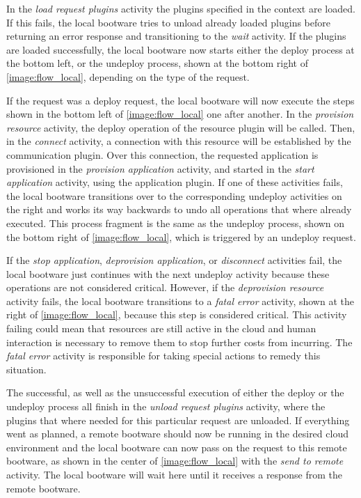 In the \textit{load request plugins} activity the plugins specified in the context are loaded.
If this fails, the local bootware tries to unload already loaded plugins before returning an error response and transitioning to the \textit{wait} activity.
If the plugins are loaded successfully, the local bootware now starts either the deploy process at the bottom left, or the undeploy process, shown at the bottom right of \autoref{image:flow_local}, depending on the type of the request.

If the request was a deploy request, the local bootware will now execute the steps shown in the bottom left of \autoref{image:flow_local} one after another.
In the \textit{provision resource} activity, the deploy operation of the resource plugin will be called.
Then, in the \textit{connect} activity, a connection with this resource will be established by the communication plugin.
Over this connection, the requested application is provisioned in the \textit{provision application} activity, and started in the \textit{start application} activity, using the application plugin.
If one of these activities fails, the local bootware transitions over to the corresponding undeploy activities on the right and works its way backwards to undo all operations that where already executed.
This process fragment is the same as the undeploy process, shown on the bottom right of \autoref{image:flow_local}, which is triggered by an undeploy request.

If the \textit{stop application}, \textit{deprovision application}, or \textit{disconnect} activities fail, the local bootware just continues with the next undeploy activity because these operations are not considered critical.
However, if the \textit{deprovision resource} activity fails, the local bootware transitions to a \textit{fatal error} activity, shown at the right of \autoref{image:flow_local}, because this step is considered critical.
This activity failing could mean that resources are still active in the cloud and human interaction is necessary to remove them to stop further costs from incurring.
The \textit{fatal error} activity is responsible for taking special actions to remedy this situation.

The successful, as well as the unsuccessful execution of either the deploy or the undeploy process all finish in the \textit{unload request plugins} activity, where the plugins that where needed for this particular request are unloaded.
If everything went as planned, a remote bootware should now be running in the desired cloud environment and the local bootware can now pass on the request to this remote bootware, as shown in the center of \autoref{image:flow_local} with the \textit{send to remote} activity.
The local bootware will wait here until it receives a response from the remote bootware.

